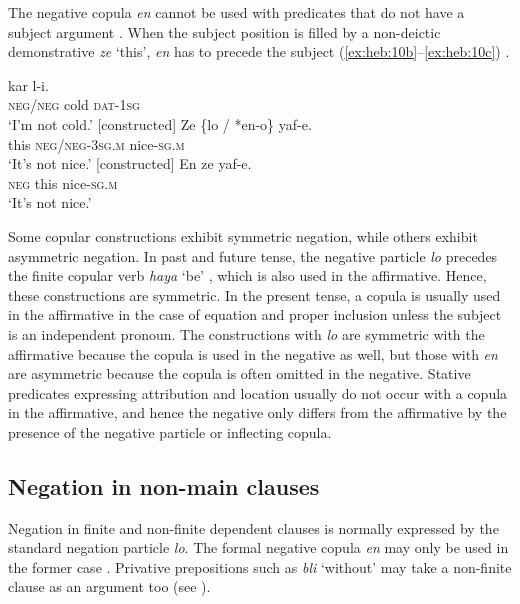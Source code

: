 \documentclass[output=paper,colorlinks,citecolor=brown]{langscibook}
\begin{document}
The negative copula \textit{en} cannot be used with predicates that do not have a subject argument . When the subject position is filled by a non-deictic demonstrative \textit{ze} ‘this', \textit{en} has to precede the subject (\ref{ex:heb:10b}--\ref{ex:heb:10c}) \citep[297]{Glinert1989}.


\ea\label{ex:heb:10}
    \ea\label{ex:heb:10a}
         kar l-i.\\ 
              \textsc{neg/neg} cold \textsc{dat-1sg}\\
        \glt ‘I’m not cold.’ [constructed]
    \ex\label{ex:heb:10b}
        \gll Ze {\{lo / *en-o\}} yaf-e. \\
              this \textsc{neg/neg-3sg.m} nice-\textsc{sg.m}\\
        \glt  ‘It’s not nice.’ [constructed]
    \ex\label{ex:heb:10c}
        \gll En ze yaf-e.\\
            \textsc{neg} this nice-\textsc{sg.m}\\
        \glt ‘It’s not nice.’ \citep[216]{Tzivoni1993}
    \z
\z 


Some copular constructions exhibit symmetric negation, while others exhibit asymmetric negation. In past and future tense, the negative particle \textit{lo} precedes the finite copular verb \textit{haya} ‘be’ , which is also used in the affirmative. Hence, these constructions are symmetric. In the present tense, a copula is usually used in the affirmative in the case of equation  and proper inclusion  unless the subject is an independent pronoun. The constructions with \textit{lo} are symmetric with the affirmative because the copula is used in the negative as well, but those with \textit{en} are asymmetric because the copula is often omitted in the negative. Stative predicates expressing attribution  and location  usually do not occur with a copula in the affirmative, and hence the negative only differs from the affirmative by the presence of the negative particle or inflecting copula.

\subsection{Negation in non-main clauses} \label{sec:heb:2.4}

Negation in finite  and non-finite  dependent clauses is normally expressed by the standard negation particle \textit{lo}. The formal negative copula \textit{en} may only be used in the former case . Privative prepositions such as \textit{bli} ‘without’ may take a non-finite clause as an argument too (see ).
\end{document}
